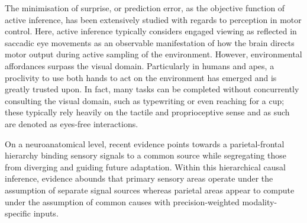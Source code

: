 The minimisation of surprise, or prediction error, as the objective function of active inference, has been extensively studied with regards to perception in motor control. Here, active inference typically considers engaged viewing as reflected in saccadic eye movements as an observable manifestation of how the brain directs motor output during active sampling of the environment. However, environmental affordances surpass the visual domain. Particularly in humans and apes, a proclivity to use both hands to act on the environment has emerged and is greatly trusted upon. In fact, many tasks can be completed without concurrently consulting the visual domain, such as typewriting or even reaching for a cup; these typically rely heavily on the tactile and proprioceptive sense and as such are denoted as eyes-free interactions.


On a neuroanatomical level, recent evidence points towards a parietal-frontal hierarchy binding sensory signals to a common source while segregating those from diverging and guiding future adaptation. Within this hierarchical causal inference, evidence abounds that primary sensory areas operate under the assumption of separate signal sources whereas parietal areas appear to compute under the assumption of common causes with precision-weighted modality-specific inputs. 


